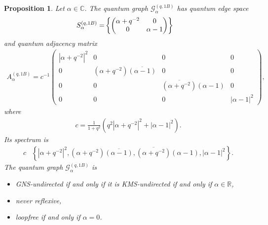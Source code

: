 \documentclass{amsart}
\newtheorem{proposition}[thm]{Proposition}
\newcommand{\R}{\mathbb{R}}
\newcommand{\C}{\mathbb{C}}
\begin{document}
\begin{proposition}
\label{ntg::prop:qgraph_G_alpha_on_(M2,psi_q)_with_one_edge}
    Let $\alpha\in\C$.
    The quantum graph $\mathcal{G}_\alpha^{(q,1B)}$ has quantum edge space
    \begin{align*}
        S_\alpha^{(q,1B)} = \span\left\{ \begin{pmatrix}
            \alpha + q^{-2} & 0 \\
            0 & \alpha - 1
        \end{pmatrix} \right\}
    \end{align*}
    and quantum adjacency matrix
    \begin{align*}
        A_\alpha^{(q,1B)} = c^{-1}\begin{pmatrix}
            |\alpha+q^{-2}|^2 & 0 & 0 & 0 \\
            0 & (\alpha+q^{-2})\overline{(\alpha-1)} & 0 & 0 \\
            0 & 0 & \overline{(\alpha+q^{-2})}(\alpha-1) & 0 \\
            0 & 0 & 0 & |\alpha-1|^2
        \end{pmatrix},
    \end{align*}
    where 
    \begin{align*}
    c= \frac{1}{1+q^2}\left( q^2|\alpha+q^{-2}|^2 + |\alpha-1|^2 \right).
    \end{align*}
    Its spectrum is
    \begin{align*}
        c & \left\{ |\alpha+q^{-2}|^2, (\alpha+q^{-2})\overline{(\alpha-1)}, \overline{(\alpha+q^{-2})}(\alpha-1), |\alpha-1|^2\right\}.
    \end{align*}
    The quantum graph $\mathcal{G}_\alpha^{(q,1B)}$ is
    \begin{itemize}
        \item GNS-undirected if and only if it is KMS-undirected if and only if $\alpha \in \R$,
        \item never reflexive,
        \item loopfree if and only if $\alpha = 0$.
    \end{itemize}
\end{proposition}
\end{document}

